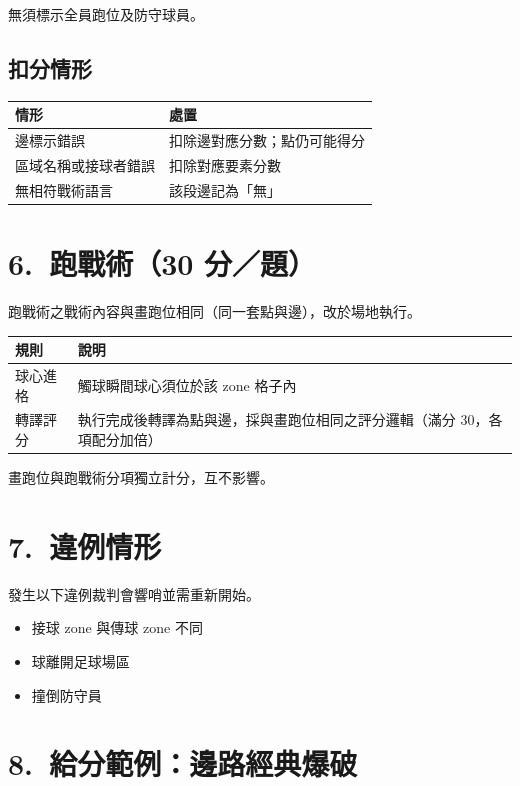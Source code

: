 \documentclass[11pt]{article}
\begin{document}
\noindent
無須標示全員跑位及防守球員。

\subsection*{扣分情形}

\vspace{0.3em}
\begin{tabular}{@{}ll@{}}
\toprule
\textbf{情形} & \textbf{處置} \\
\midrule
邊標示錯誤 & 扣除邊對應分數；點仍可能得分 \\
區域名稱或接球者錯誤 & 扣除對應要素分數 \\
無相符戰術語言 & 該段邊記為「無」 \\
\bottomrule
\end{tabular}

\section*{6.\ 跑戰術（30 分／題）}

跑戰術之戰術內容與畫跑位相同（同一套點與邊），改於場地執行。

\vspace{0.4em}
\begin{tabular}{@{}ll@{}}
\toprule
\textbf{規則} & \textbf{說明} \\
\midrule
球心進格 & 觸球瞬間球心須位於該 zone 格子內 \\
轉譯評分 & 執行完成後轉譯為點與邊，採與畫跑位相同之評分邏輯（滿分 30，各項配分加倍） \\
\bottomrule
\end{tabular}

\vspace{0.4em}
\noindent
畫跑位與跑戰術分項獨立計分，互不影響。

\section*{7.\ 違例情形}

發生以下違例裁判會響哨並需重新開始。

\begin{itemize}
  \item 接球 zone 與傳球 zone 不同
  \item 球離開足球場區
  \item 撞倒防守員
\end{itemize}

\section*{8.\ 給分範例：邊路經典爆破}
\end{document}
